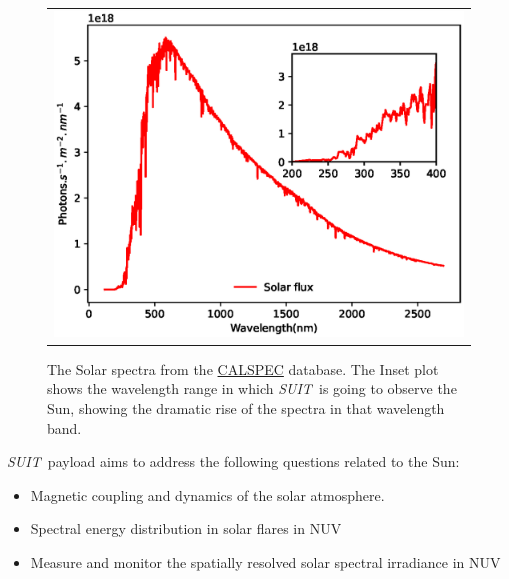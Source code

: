 \documentclass[12pt]{spieman}  %
\newcommand{\suit}{{\it SUIT~}}
\begin{document}
\begin{figure}[ht]
\begin{center}
\begin{tabular}{c}
\includegraphics[width=0.7\linewidth]{spectrum_sun.eps}
\end{tabular}
\end{center}
\caption 
{ \label{fig:sun_spec} The Solar spectra from the \href{https://www.stsci.edu/hst/instrumentation/reference-data-for-calibration-and-tools/astronomical-catalogs/calspec}{CALSPEC} database. The Inset plot shows the wavelength range in which \suit is going to observe the Sun, showing the dramatic rise of the spectra in that wavelength band.} 
\end{figure} 

\suit  payload aims to address the following questions related to the Sun:

\begin{itemize}
    \item Magnetic coupling and dynamics of the solar atmosphere.
    \item Spectral energy distribution in solar flares in NUV
    \item Measure and monitor the spatially resolved solar spectral irradiance in NUV
\end{itemize}
\end{document}
